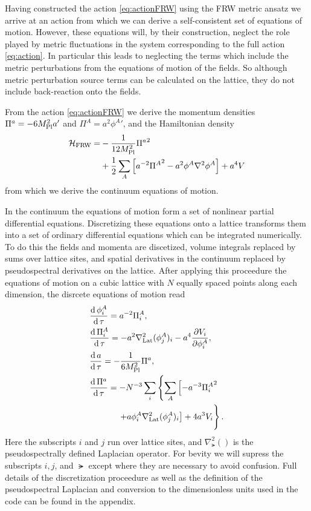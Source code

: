 Having constructed the action \eqref{eq:actionFRW} using the FRW metric ansatz we arrive at an action from which we can derive a self-consistent set of equations of motion. However, these equations will, by their construction, neglect the role played by metric fluctuations in the system corresponding to the full action \eqref{eq:action}. 
In particular this leads to neglecting the terms which include the metric perturbations from the equations of motion of the fields. So although metric perturbation source terms can be calculated on the lattice, they do not include back-reaction onto the fields.

From the action \eqref{eq:actionFRW} we derive the momentum densities $\Pi^a=-6M_{\mathrm{Pl}}^2a'$ and $\Pi^A=a^2{\phi^A}'$, and the Hamiltonian density
\begin{align} \label{eq:hamFRW}
  \begin{split}
    \mathcal{H}_\mathrm{FRW} = &-\frac{1}{12M_{\mathrm{Pl}}^2}{\Pi^a}^2 \\
    &+ \frac{1}{2}\sum_A\left[ a^{-2}{\Pi^A}^2 -a^2\phi^A\nabla^2\phi^A \right] +a^4V
    \end{split}
\end{align}
from which we derive the continuum equations of motion.

In the continuum the equations of motion form a set of nonlinear partial differential equations. Discretizing these equations onto a lattice transforms them into a set of ordinary differential equations which can be integrated numerically. To do this the fields and momenta are discetized, volume integrals replaced by sums over lattice sites, and spatial derivatives in the continuum replaced by pseudospectral derivatives on the lattice. After applying this proceedure the equations of motion on a cubic lattice with $N$ equally spaced points along each dimension, the disrcete equations of motion read
\begin{align}
  & \frac{\dd\phi^A_i}{\dd\tau} = a^{-2}\Pi^A_i,  \label{eq:lat eom a}\\
  & \frac{\dd\Pi^A_i}{\dd\tau} = -a^2\nabla^2_\lat(\phi^A_j)_i -a^4\frac{\partial V_i}{\partial \phi^A_i},  \label{eq:lat eom pi phi}\\
  & \frac{\dd a}{\dd\tau} = -\frac{1}{6\mpl^2}\Pi^a,  \label{eq:lat eom phi} \\
  & \frac{\dd\Pi^a}{\dd\tau} = -N^{-3}\sum_i\left\{ \sum_A\left[-a^{-3}{\Pi^A_i}^2 \right.\right. \nonumber \\
    & \hphantom{\frac{\dd\Pi^a}{\dd\tau} = } \left.\left. + a\phi^A_i\nabla^2_\lat(\phi^A_j)_i \right] + 4a^3V_i\vphantom{\sum_A}\right\}. \label{eq:lat eom pi a}  
\end{align}
Here the subscripts $i$ and $j$ run over lattice sites, and $\nabla^2_\lat()$ is the pseudospectrally defined Laplacian operator.
For bevity we will supress the subscripts $i,j$, and $\lat$ except where they are necessary to avoid confusion.
Full details of the discretization proceedure as well as the definition of the pseudospectral Laplacian and conversion to the dimensionless units used in the code can be found in the appendix.

